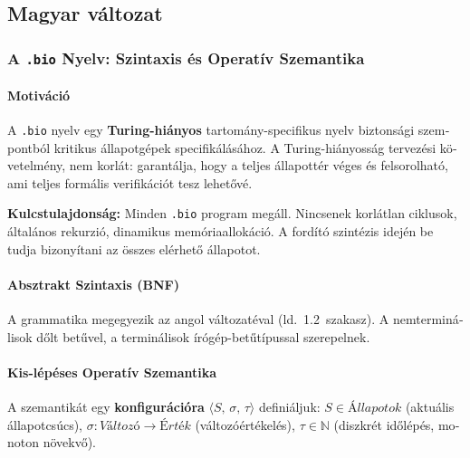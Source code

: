 \documentclass[11pt,a4paper,twoside]{article}
\begin{document}
\begin{magyar}
\part{Magyar változat}

\section{A \texttt{.bio} Nyelv: Szintaxis és Operatív Szemantika}

\subsection{Motiváció}

A \texttt{.bio} nyelv egy \textbf{Turing-hiányos} tartomány-specifikus nyelv
biztonsági szempontból kritikus állapotgépek specifikálásához.
A Turing-hiányosság tervezési követelmény, nem korlát: garantálja, hogy a
teljes állapottér véges és felsorolható, ami teljes formális verifikációt tesz lehetővé.

\begin{mdframed}[style=notebox]
\textbf{Kulcstulajdonság:} Minden \texttt{.bio} program megáll.
Nincsenek korlátlan ciklusok, általános rekurzió, dinamikus memóriaallokáció.
A fordító szintézis idején be tudja bizonyítani az összes elérhető állapotot.
\end{mdframed}

\subsection{Absztrakt Szintaxis (BNF)}

A grammatika megegyezik az angol változatéval (ld.\ 1.2~szakasz). A nemterminálisok
dőlt betűvel, a terminálisok írógép-betűtípussal szerepelnek.

\subsection{Kis-lépéses Operatív Szemantika}

A szemantikát egy \textbf{konfigurációra} $\langle S,\,\sigma,\,\tau\rangle$
definiáljuk:
$S \in \textit{Állapotok}$ (aktuális állapotcsúcs),
$\sigma : \textit{Változó} \to \textit{Érték}$ (változóértékelés),
$\tau \in \mathbb{N}$ (diszkrét időlépés, monoton növekvő).


\end{magyar}
\end{document}
